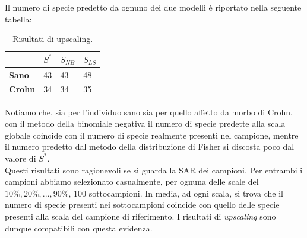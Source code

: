 Il numero di specie predetto da ognuno dei due modelli è riportato nella seguente tabella:

\begin{table}[H]
\centering
\begin{tabular}{l|l|l|l|}
\cline{2-4}
                                     & $S^*$ & $S_{NB}$ & $S_{LS}$ \\ \hline
\multicolumn{1}{|l|}{\textbf{Sano}}  & 43  & 43       & 48       \\ \hline
\multicolumn{1}{|l|}{\textbf{Crohn}} & 34  & 34       & 35       \\ \hline
\end{tabular}
\caption{Risultati di upscaling.}
\label{Tab:risultatiup}
\end{table}

Notiamo che, sia per l'individuo sano sia per quello affetto da morbo di Crohn, con il metodo della binomiale negativa il numero di specie predette alla scala globale coincide con il numero di specie realmente presenti nel campione, mentre il numero predetto dal metodo della distribuzione di Fisher si discosta poco dal valore di $S^*$.\\
Questi risultati sono ragionevoli se si guarda la SAR dei campioni. Per entrambi i campioni abbiamo selezionato casualmente, per ognuna delle scale del $10\%,20\%,...,90\%$, 100 sottocampioni. In media, ad ogni scala, si trova che il numero di specie presenti nei sottocampioni coincide con quello delle specie presenti alla scala del campione di riferimento. I risultati di \emph{upscaling} sono dunque compatibili con questa evidenza. 